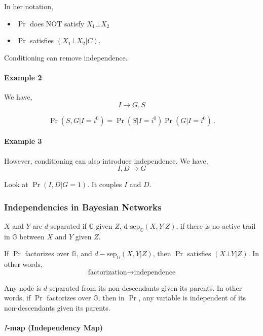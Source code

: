 \documentclass[12pt]{article}
\begin{document}
In her notation,
\begin{itemize}
  \item $\Pr$ does NOT satisfy $X_1 \bot X_2$
  \item $\Pr$ satisfies $(X_1 \bot X_2 | C)$.
\end{itemize}
Conditioning can remove independence.


\paragraph{Example 2} 
We have,
\begin{equation*}
I \rightarrow G, S
\end{equation*}

\begin{equation*}
  \Pr(S, G | I=i^0) = \Pr(S | I=i^0) \Pr(G | I=i^0) \, .
\end{equation*}



\paragraph{Example 3} However, conditioning can also introduce independence.
We have,
\begin{equation*}
I, D \rightarrow G
\end{equation*}

Look at $\Pr(I, D| G = 1)$.  It couples $I$ and $D$.


\subsubsection{Independencies in Bayesian Networks}
$X$ and $Y$ are $d$-separated if $\mathbb{G}$ given $Z$,
$\text{d-sep}_{\mathbb{G}}(X, Y|Z)$,
if there is no active trail in $\mathbb{G}$ between $X$
and $Y$ given $Z$.

If $\Pr$ factorizes over $\mathbb{G}$, and $d-\text{sep}_{\mathbb{G}}(X, Y|Z)$, then $\Pr$ satisfies $(X \bot Y | Z)$.
In other words,
\begin{equation*}
  \text{factorization} \rightarrow \text{independence}
\end{equation*}

Any node is $d$-separated from its non-descendants given its parents.
In other words, if $\Pr$ factorizes over $\mathbb{G}$, then in $\Pr$,
any variable is independent of its non-descendants given its parents.


\paragraph{$I$-map (Independency Map)}
\end{document}

